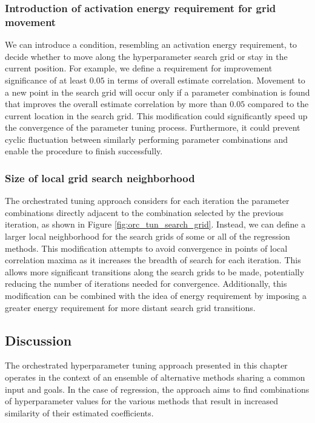 \subsubsection{Introduction of activation energy requirement for grid movement}
We can introduce a condition, resembling an activation energy requirement, to decide whether to move along the hyperparameter search grid or stay in the current position. For example, we define a requirement for improvement significance of at least $0.05$ in terms of overall estimate correlation. Movement to a new point in the search grid will occur only if a parameter combination is found that improves the overall estimate correlation by more than $0.05$ compared to the current location in the search grid.
This modification could significantly speed up the convergence of the parameter tuning process. Furthermore, it could prevent cyclic fluctuation between similarly performing parameter combinations and enable the procedure to finish successfully.

\subsubsection{Size of local grid search neighborhood}
The orchestrated tuning approach considers for each iteration the parameter combinations directly adjacent to the combination selected by the previous iteration, as shown in Figure \ref{fig:orc_tun_search_grid}. Instead, we can define a larger local neighborhood for the search grids of some or all of the regression methods.
This modification attempts to avoid convergence in points of local correlation maxima as it increases the breadth of search for each iteration. This allows more significant transitions along the search grids to be made, potentially reducing the number of iterations needed for convergence. 
Additionally, this modification can be combined with the idea of energy requirement by imposing a greater energy requirement for more distant search grid transitions.

\subsection{Discussion}
The orchestrated hyperparameter tuning approach presented in this chapter operates in the context of an ensemble of alternative methods sharing a common input and goals. In the case of regression, the approach aims to find combinations of hyperparameter values for the various methods that result in increased similarity of their estimated coefficients.

